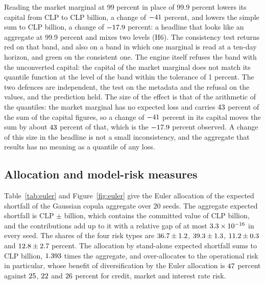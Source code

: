 Reading the market marginal at 99 percent in place of 99.9 percent lowers its capital from CLP \bdEcMarket{} to
CLP \bdMarketEcNineNine{} billion, a change of $-41$ percent, and lowers the simple sum to CLP \bdSumMismatch{}
billion, a change of $-17.9$ percent: a headline that looks like an aggregate at 99.9 percent and mixes two levels (H6).
The consistency test returns red on that band, and also on a band in which one marginal is read at a ten-day horizon, and green on
the consistent one. The engine itself refuses the band with the unconverted capital: the capital of the market marginal does not match
its quantile function at the level of the band within the tolerance of 1 percent. The two defences are independent, the test on the
metadata and the refusal on the values, and the prediction held. The size of the effect is that of the arithmetic of the
quantiles: the market marginal has no expected loss and carries $43$ percent of the sum of the capital figures, so a
change of $-41$ percent in its capital moves the sum by about $43$ percent of that, which is the
$-17.9$ percent observed. A change of this size in the headline is not a small inconsistency, and the aggregate that
results has no meaning as a quantile of any loss.

\subsection{Allocation and model-risk measures}
\label{sec:results-allocation}

Table~\ref{tab:euler} and Figure~\ref{fig:euler} give the Euler allocation of the expected shortfall of the Gaussian copula
aggregate over $20$ seeds. The aggregate expected shortfall is CLP \bdEsTotalMean{} $\pm$ \bdEsTotalSd{} billion, which contains the
committed value of CLP \bdEsTotal{} billion, and the contributions add up to it with a relative gap of at most $3.3\times 10^{-16}$ in every
seed. The shares of the four risk types are $36.7\pm1.2$, $39.3\pm1.3$,
$11.2\pm0.3$ and $12.8\pm2.7$ percent. The allocation by stand-alone expected
shortfall sums to CLP \bdSumStandaloneEs{} billion, $1.393$ times the aggregate, and over-allocates to the operational risk in
particular, whose benefit of diversification by the Euler allocation is $47$ percent against $25$,
$22$ and $26$ percent for credit, market and interest rate risk.

